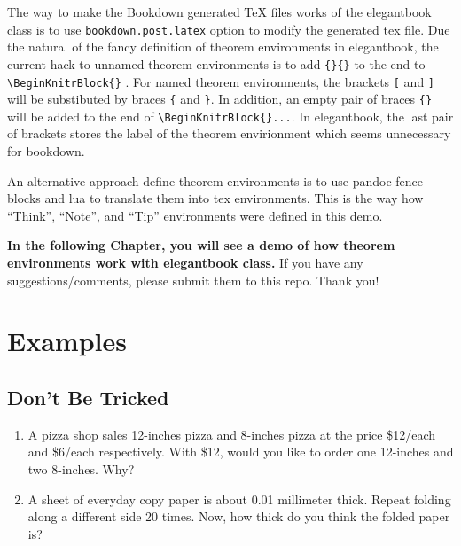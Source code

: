 \documentclass[en,11pt]{elegantbook}
\newcommand{\size}[2]{{\fontsize{#1}{0}\selectfont#2}}
\newcommand{\thinkname}{思考}
\newcommand{\thinkname}{Think}
\newenvironment{rmdthink}{
	\vspace*{0.5\baselineskip}
	\par\noindent
	\makebox[-4pt][r]{\color{green!90}\size{12}{\faLightbulbO}\,\,}
    \begin{tcolorbox}[
    enhanced,
    title={\textbf{\color{second}\thinkname}},
    title style={left color=blue!10!green!20!white,right color=yellow!20!blue!20!white},
    colback=green!20!white,
    ]
    \sffamily
}{
    \end{tcolorbox}
	\par\ignorespacesafterend
}
\begin{document}
The way to make the Bookdown generated TeX files works of the elegantbook class is to use \texttt{bookdown.post.latex} option to modify the generated tex file. Due the natural of the fancy definition of theorem environments in elegantbook, the current hack to unnamed theorem environments is to add \texttt{\{\}\{\}} to the end to \texttt{\textbackslash{}BeginKnitrBlock\{\}} . For named theorem environments, the brackets \texttt{{[}} and \texttt{{]}} will be substibuted by braces \texttt{\{} and \texttt{\}}. In addition, an empty pair of braces \texttt{\{\}} will be added to the end of \texttt{\textbackslash{}BeginKnitrBlock\{\}...}. In elegantbook, the last pair of brackets stores the label of the theorem envirionment which seems unnecessary for bookdown.

An alternative approach define theorem environments is to use pandoc fence blocks and lua to translate them into tex environments. This is the way how ``Think'', ``Note'', and ``Tip'' environments were defined in this demo.

\textbf{In the following Chapter, you will see a demo of how theorem environments work with elegantbook class.} If you have any suggestions/comments, please submit them to this repo. Thank you!

\hypertarget{examples}{%
\chapter{Examples}\label{examples}}

\hypertarget{dont-be-tricked}{%
\section{Don't Be Tricked}\label{dont-be-tricked}}

\begin{rmdthink}

\begin{enumerate}
\def\labelenumi{\arabic{enumi}.}
\item
  A pizza shop sales 12-inches pizza and 8-inches pizza at the price \$12/each and \$6/each respectively. With \$12, would you like to order one 12-inches and two 8-inches. Why?
\item
  A sheet of everyday copy paper is about 0.01 millimeter thick. Repeat folding along a different side 20 times. Now, how thick do you think the folded paper is?
\end{enumerate}

\end{rmdthink}
\end{document}
